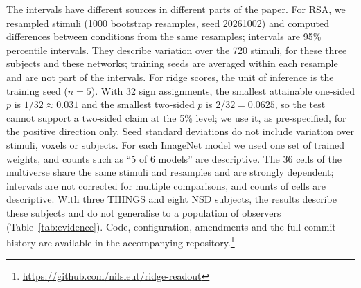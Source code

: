 The intervals have different sources in different parts of the paper. For RSA, we resampled stimuli (1000 bootstrap resamples, seed 20261002) and computed differences between conditions from the same resamples; intervals are 95\% percentile intervals. They describe variation over the 720 stimuli, for these three subjects and these networks; training seeds are averaged within each resample and are not part of the intervals. For ridge scores, the unit of inference is the training seed ($n = 5$). With 32 sign assignments, the smallest attainable one-sided $p$ is $1/32 \approx 0.031$ and the smallest two-sided $p$ is $2/32 = 0.0625$, so the test cannot support a two-sided claim at the 5\% level; we use it, as pre-specified, for the positive direction only. Seed standard deviations do not include variation over stimuli, voxels or subjects. For each ImageNet model we used one set of trained weights, and counts such as ``5 of 6 models'' are descriptive. The 36 cells of the multiverse share the same stimuli and resamples and are strongly dependent; intervals are not corrected for multiple comparisons, and counts of cells are descriptive. With three THINGS and eight NSD subjects, the results describe these subjects and do not generalise to a population of observers (Table~\ref{tab:evidence}). Code, configuration, amendments and the full commit history are available in the accompanying repository.\footnote{\url{https://github.com/nilsleut/ridge-readout}}
